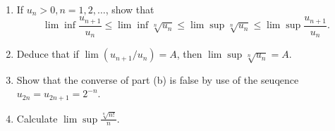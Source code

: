 \documentclass[10pt]{amsart}
\theoremstyle{plain}
\newenvironment{exercise}[1]{%
  \renewcommand\themanualtheoreminner{#1}%
  \manualtheoreminner
}{\endmanualtheoreminner}
\theoremstyle{definition}
\begin{document}
\begin{exercise}{2.51}
	\
	\begin{enumerate}
		\item If $u_n > 0, n = 1,2,\dots$, show that
			\[
				\lim \inf \frac{u_{n+1}}{u_n} \leq \lim\inf \sqrt[n]{u_n} \leq \lim\sup \sqrt[n]{u_n}  \leq \lim\sup \frac{u_{n+1}}{u_n}.
			\] 
		\item Deduce that if $\lim(u_{n+1}/u_n)=A$, then $\lim\sup \sqrt[n]{u_n}  = A$.
		\item Show that the converse of part (b) is false by use of the seuqence $u_{2n}=u_{2n+1}=2^{-n}$.
		\item Calculate $\lim\sup  \frac{\sqrt[n]{n!}}{n}$.
	\end{enumerate}
	\hrulefill
\end{exercise}
\end{document}
